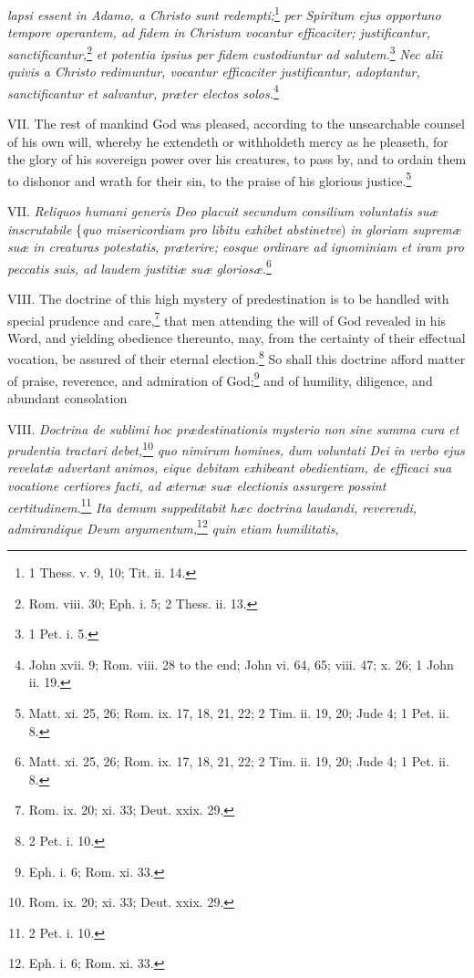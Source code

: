 \emph{lapsi essent in Adamo, a Christo sunt redempti;}\footnote{1 Thess. v. 9, 10; Tit. ii. 14.}\emph{ per Spiritum ejus opportuno tempore operantem, ad fidem in Christum vocantur efficaciter; justificantur, sanctificantur,}\footnote{Rom. viii. 30; Eph. i. 5; 2 Thess. ii. 13.}\emph{ et potentia ipsius per fidem custodiuntur ad salutem.}\footnote{1 Pet. i. 5.}\emph{ Nec alii quivis a Christo redimuntur, vocantur efficaciter justificantur, adoptantur, sanctificantur et salvantur, præter electos solos.}\footnote{John xvii. 9; Rom. viii. 28 to the end; John vi. 64, 65; viii. 47; x. 26; 1 John ii. 19.}

VII. The rest of mankind God was pleased, according to the unsearchable counsel of his own will, whereby he extendeth or withholdeth mercy as he pleaseth, for the glory of his sovereign power over his creatures, to pass by, and to ordain them to dishonor and wrath for their sin, to the praise of his glorious justice.\footnote{Matt. xi. 25, 26; Rom. ix. 17, 18, 21, 22; 2 Tim. ii. 19, 20; Jude 4; 1 Pet. ii. 8.}

VII. \emph{Reliquos humani generis Deo placuit secundum consilium voluntatis suæ inscrutabile} \{\emph{quo misericordiam pro libitu exhibet abstinetve}) \emph{in gloriam supremæ suæ in creaturas potestatis, præterire; eosque ordinare ad ignominiam et iram pro peccatis suis, ad laudem justitiæ suæ gloriosæ.}\footnote{Matt. xi. 25, 26; Rom. ix. 17, 18, 21, 22; 2 Tim. ii. 19, 20; Jude 4; 1 Pet. ii. 8.}

VIII. The doctrine of this high mystery of predestination is to be handled with special prudence and care,\footnote{Rom. ix. 20; xi. 33; Deut. xxix. 29.} that men attending the will of God revealed in his Word, and yielding obedience thereunto, may, from the certainty of their effectual vocation, be assured of their eternal election.\footnote{2 Pet. i. 10.} So shall this doctrine afford matter of praise, reverence, and admiration of God;\footnote{Eph. i. 6; Rom. xi. 33.} and of humility, diligence, and abundant consolation

VIII. \emph{Doctrina de sublimi hoc prædestinationis mysterio non sine summa cura et prudentia tractari debet,}\footnote{Rom. ix. 20; xi. 33; Deut. xxix. 29.}\emph{ quo nimirum homines, dum voluntati Dei in verbo ejus revelatæ advertant animos, eique debitam exhibeant obedientiam, de efficaci sua vocatione certiores facti, ad æternæ suæ electionis assurgere possint certitudinem.}\footnote{2 Pet. i. 10.}\emph{ Ita demum suppeditabit hæc doctrina laudandi, reverendi, admirandique Deum argumentum,}\footnote{Eph. i. 6; Rom. xi. 33.} \emph{quin etiam humilitatis, }

